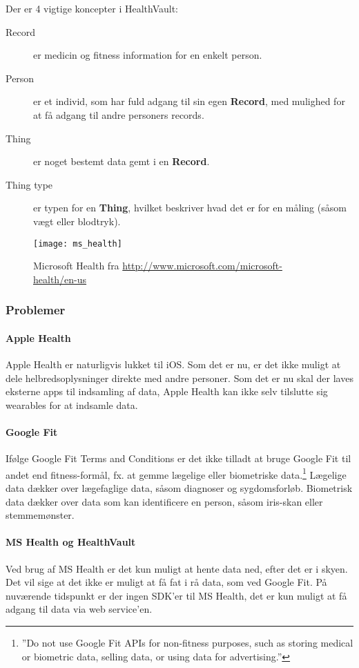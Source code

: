 Der er 4 vigtige koncepter i HealthVault:
\begin{description}
\item[Record] er medicin og fitness information for en enkelt person.
\item[Person] er et individ, som har fuld adgang til sin egen \textbf{Record}, med mulighed for at få adgang til andre personers records.
\item[Thing] er noget bestemt data gemt i en \textbf{Record}.
\item[Thing type] er typen for en \textbf{Thing}, hvilket beskriver hvad det er for en måling (såsom vægt eller blodtryk).
\end{description}

\begin{figure}
\centering
\texttt{[image: ms\_health]}
\caption{Microsoft Health fra \url{http://www.microsoft.com/microsoft-health/en-us}}
\label{eksisterende_systemer:ms_health_fig}
\end{figure}

\subsubsection{Problemer}

\paragraph{Apple Health}
Apple Health er naturligvis lukket til iOS.
Som det er nu, er det ikke muligt at dele helbredsoplysninger direkte med andre personer.
Som det er nu skal der laves eksterne apps til indsamling af data, Apple Health kan ikke selv tilslutte sig wearables for at indsamle data.

\paragraph{Google Fit}
Ifølge Google Fit Terms and Conditions er det ikke tilladt at bruge Google Fit til andet end fitness-formål, fx. at gemme lægelige eller biometriske data.\footnote{''Do not use Google Fit APIs for non-fitness purposes, such as storing medical or biometric data, selling data, or using data for advertising.''}
Lægelige data dækker over lægefaglige data, såsom diagnoser og sygdomsforløb.
Biometrisk data dækker over data som kan identificere en person, såsom iris-skan eller stemmemønster.

\paragraph{MS Health og HealthVault}
Ved brug af MS Health er det kun muligt at hente data ned, efter det er i skyen.
Det vil sige at det ikke er muligt at få fat i rå data, som ved Google Fit.
På nuværende tidspunkt er der ingen SDK'er til MS Health, det er kun muligt at få adgang til data via web service'en.
